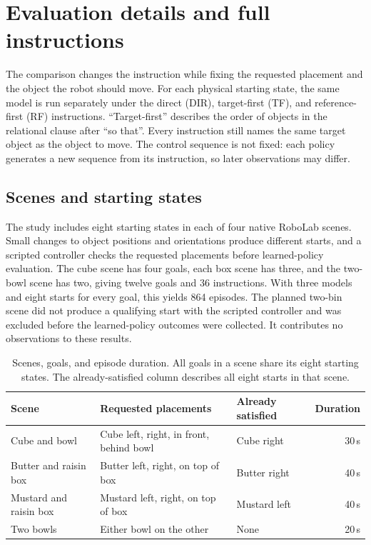 \documentclass{article}
\begin{document}
\clearpage

\clearpage
\appendix

\setlength{\parskip}{5.5pt}
\section{Evaluation details and full instructions}
\label{app:tasks}
The comparison changes the instruction while fixing the requested placement and the object the robot should move. For each physical starting state, the same model is run separately under the direct (DIR), target-first (TF), and reference-first (RF) instructions. ``Target-first'' describes the order of objects in the relational clause after ``so that''. Every instruction still names the same target object as the object to move. The control sequence is not fixed: each policy generates a new sequence from its instruction, so later observations may differ.

\subsection{Scenes and starting states}
The study includes eight starting states in each of four native RoboLab scenes. Small changes to object positions and orientations produce different starts, and a scripted controller checks the requested placements before learned-policy evaluation. The cube scene has four goals, each box scene has three, and the two-bowl scene has two, giving twelve goals and 36 instructions. With three models and eight starts for every goal, this yields 864 episodes. The planned two-bin scene did not produce a qualifying start with the scripted controller and was excluded before the learned-policy outcomes were collected. It contributes no observations to these results.

\begin{table}[htbp]
\centering\small
\caption{Scenes, goals, and episode duration. All goals in a scene share its eight starting states. The already-satisfied column describes all eight starts in that scene.}
\label{tab:appendix-scenes}
\begin{tabular}{@{}p{.25\linewidth}p{.36\linewidth}p{.20\linewidth}r@{}}
\toprule Scene & Requested placements & Already satisfied & Duration\\
\midrule
Cube and bowl & Cube left, right, in front, behind bowl & Cube right & 30\,s\\
Butter and raisin box & Butter left, right, on top of box & Butter right & 40\,s\\
Mustard and raisin box & Mustard left, right, on top of box & Mustard left & 40\,s\\
Two bowls & Either bowl on the other & None & 20\,s\\
\bottomrule
\end{tabular}
\end{table}
\end{document}
